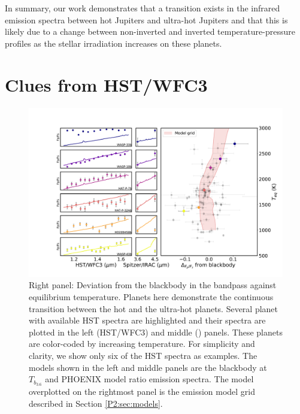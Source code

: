 In summary, our work demonstrates that a transition exists in the infrared emission spectra between hot Jupiters and ultra-hot Jupiters and that this is likely due to a change between non-inverted and inverted temperature-pressure profiles as the stellar irradiation increases on these planets.

\section{Clues from HST/WFC3}
\label{P2:app:HST}

\begin{figure}
    \centering
    \includegraphics[trim={3.5cm 1cm 0cm 1cm},clip,width=\textwidth]{devBBandHST_Teq_selection.pdf}
    \caption{Right  panel: Deviation from the blackbody in the \spitzer bandpass against equilibrium temperature. Planets here demonstrate the continuous transition between the hot and the ultra-hot planets. Several planet with available HST spectra are highlighted and their spectra are plotted in the left   (HST/WFC3) and middle (\spitzer) panels. These planets are color-coded by increasing temperature. For simplicity and clarity, we show only six of the HST spectra as examples. The models shown in the left and middle panels are the blackbody at $T_{b_{3.6}}$ and PHOENIX model ratio emission spectra. The model overplotted on the rightmost panel is the emission model grid described in Section \ref{P2:sec:models}.}
    \label{P2:fig:devBBHST}
\end{figure}

